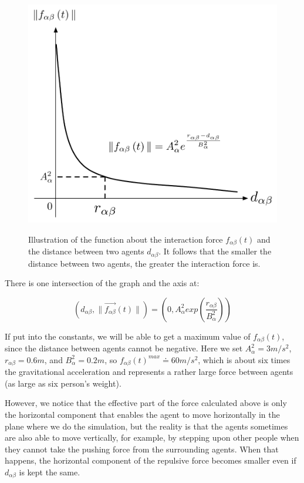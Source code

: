 \begin{figure}
    \centering
    {\includegraphics[scale=0.45]{Figures/physicalinteraction.pdf}} 
    \caption[Psysical interaction]{Illustration of the function about the interaction force 
        $f_{\alpha\beta}(t)$ and the distance between two agents
        $d_{\alpha \beta}$. It follows that the smaller the distance between two agents, the greater the interaction force is. }
    \label{physicalinteraction}
\end{figure}

There is one intersection of the graph and the  axis at:

\begin{equation}
	\left( d_{\alpha \beta} , \| \vec{f_{\alpha \beta}} \left( t \right) \| \right)
 =
	\left( 0 , A_{\alpha}^{2} exp\left( \frac{r_{\alpha\beta} }{B_{\alpha}^{2}}\right)  \right) 
\end{equation}

If put into the constants, we will be able to get a maximum value of $ f_{\alpha\beta}(t) $, 
since the distance between agents cannot be negative. Here we set $ A_{\alpha}^{2} = 3 m/s^{2} $, 
$ r_{\alpha\beta} = 0.6 m $, and $ B_{\alpha}^{2} = 0.2 m $, so 
$ f_{\alpha\beta}(t)^{max} \doteq 60 m/s^{2} $, which is about six times the gravitational 
acceleration and represents a rather large force between agents (as large as six person's weight).

However, we notice that the effective part of the force calculated above is only the horizontal 
component that enables the agent to move horizontally in the plane where we do the simulation, 
but the reality is that the agents sometimes are also able to move vertically, for example, 
by stepping upon other people when they cannot take the pushing force from the surrounding agents. 
When that happens, the horizontal component of the repulsive force becomes smaller even if $ d_{\alpha\beta} $ 
is kept the same.	

